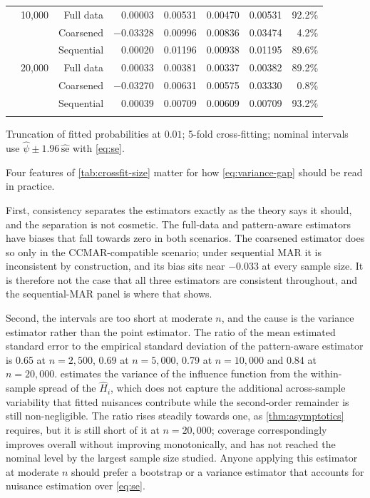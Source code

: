\begin{table}[ht]
\begin{threeparttable}
\begin{tabular}{@{}llrrrrrr@{}}
\addlinespace
 & 10,000 & Full data & 0.00003 & 0.00531 & 0.00470 & 0.00531 & 92.2\% \\
 &  & Coarsened & $-$0.03328 & 0.00996 & 0.00836 & 0.03474 & 4.2\% \\
 &  & Sequential & 0.00020 & 0.01196 & 0.00938 & 0.01195 & 89.6\% \\
\addlinespace
 & 20,000 & Full data & 0.00033 & 0.00381 & 0.00337 & 0.00382 & 89.2\% \\
 &  & Coarsened & $-$0.03270 & 0.00631 & 0.00575 & 0.03330 & 0.8\% \\
 &  & Sequential & 0.00039 & 0.00709 & 0.00609 & 0.00709 & 93.2\% \\
\addlinespace
\bottomrule
\end{tabular}
\begin{tablenotes}[flushleft]\footnotesize
\item Truncation of fitted probabilities at $0.01$; 5-fold
cross-fitting; nominal intervals use $\widehat\psi\pm1.96\,\widehat{\mathrm{se}}$
with \cref{eq:se}.
\end{tablenotes}
\end{threeparttable}
\end{table}

Four features of \cref{tab:crossfit-size} matter for how \cref{eq:variance-gap}
should be read in practice.

First, consistency separates the estimators exactly as the theory says it should,
and the separation is not cosmetic. The full-data and pattern-aware estimators
have biases that fall towards zero in both scenarios. The coarsened estimator
does so only in the CCMAR-compatible scenario; under sequential MAR it is
inconsistent by construction, and its bias sits near $-0.033$ at every sample
size. It is therefore not the case that all three estimators are consistent
throughout, and the sequential-MAR panel is where that shows.

Second, the intervals are too short at moderate $n$, and the cause is the
variance estimator rather than the point estimator. The ratio of the mean
estimated standard error to the empirical standard deviation of the
pattern-aware estimator is 0.65 at $n=2,500$, 0.69 at $n=5,000$, 0.79 at $n=10,000$ and 0.84 at $n=20,000$.  estimates the
variance of the influence function from the within-sample spread of the
$\widehat H_i$, which does not capture the additional across-sample variability
that fitted nuisances contribute while the second-order remainder is still
non-negligible. The ratio rises steadily towards one, as \cref{thm:asymptotics}
requires, but it is still short of it at $n=20{,}000$; coverage correspondingly
improves overall without improving monotonically, and has not reached the nominal
level by the largest sample size studied. Anyone applying this estimator at
moderate $n$ should prefer a bootstrap or a variance estimator that accounts for
nuisance estimation over \cref{eq:se}.

